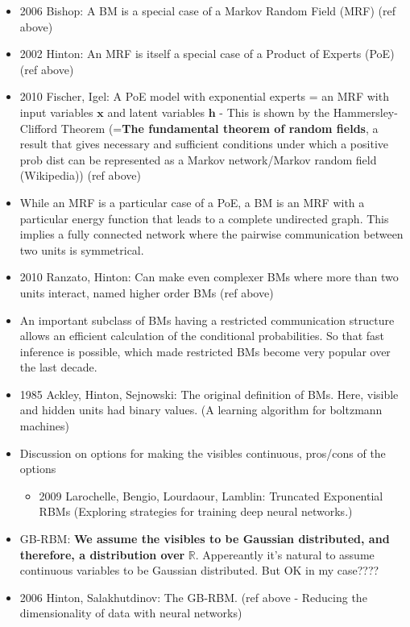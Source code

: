 \documentclass[twoside,english]{uiofysmaster}
\begin{document}
\begin{itemize}
\begin{itemize}
		\item 2006 Bishop: A BM is a special case of a Markov Random Field (MRF) \cite{Bishop2006} (ref above)
		\item 2002 Hinton: An MRF is itself a special case of a Product of Experts (PoE) (ref above) \cite{Hinton2002}
		\item 2010 Fischer, Igel: A PoE model with exponential experts = an MRF with input variables $\bm{x}$ and latent variables $\bm{h}$ - This is shown by the Hammersley-Clifford Theorem (=\textbf{The fundamental theorem of random fields}, a result that gives necessary and sufficient conditions under which a positive prob dist can be represented as a Markov network/Markov random field (Wikipedia)) (ref above)
		\item While an MRF is a particular case of a PoE, a BM is an MRF with a particular energy function that leads to a complete undirected graph. This implies a fully connected network where the pairwise communication between two units is symmetrical.
		\item 2010 Ranzato, Hinton: Can make even complexer BMs where more than two units interact, named higher order BMs (ref above) \cite{Ranzato2010a}
		\item An important subclass of BMs having a restricted communication structure allows an efficient calculation of the conditional probabilities. So that fast inference is possible, which made restricted BMs become very popular over the last decade.
		\item 1985 Ackley, Hinton, Sejnowski: The original definition of BMs. Here, visible and hidden units had binary values. (A learning algorithm for boltzmann machines) \cite{Ackley1985}
		\item Discussion on options for making the visibles continuous, pros/cons of the options
		\begin{itemize}
			\item 2009 Larochelle, Bengio, Lourdaour, Lamblin: Truncated Exponential RBMs (Exploring strategies for training deep neural networks.)
		\end{itemize}
		\item GB-RBM: \textbf{We assume the visibles to be Gaussian distributed, and therefore, a distribution over} $\mathbb{R}$. Appereantly it's natural to assume continuous variables to be Gaussian distributed. But OK in my case????
		\item 2006 Hinton, Salakhutdinov: The GB-RBM. (ref above - Reducing the dimensionality of data with neural networks) \cite{Hinton2006}

\end{itemize}
\end{itemize}
\end{document}
